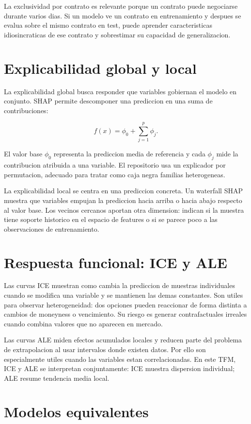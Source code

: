 La exclusividad por contrato es relevante porque un contrato puede negociarse durante varios dias. Si un modelo ve un contrato en entrenamiento y despues se evalua sobre el mismo contrato en test, puede aprender caracteristicas idiosincraticas de ese contrato y sobrestimar su capacidad de generalizacion.

\section{Explicabilidad global y local}

La explicabilidad global busca responder que variables gobiernan el modelo en conjunto. SHAP permite descomponer una prediccion en una suma de contribuciones:

\[
f(x)=\phi_0+\sum_{j=1}^{p}\phi_j.
\]

El valor base $\phi_0$ representa la prediccion media de referencia y cada $\phi_j$ mide la contribucion atribuida a una variable. El repositorio usa un explicador por permutacion, adecuado para tratar como caja negra familias heterogeneas.

La explicabilidad local se centra en una prediccion concreta. Un waterfall SHAP muestra que variables empujan la prediccion hacia arriba o hacia abajo respecto al valor base. Los vecinos cercanos aportan otra dimension: indican si la muestra tiene soporte historico en el espacio de features o si se parece poco a las observaciones de entrenamiento.

\section{Respuesta funcional: ICE y ALE}

Las curvas ICE muestran como cambia la prediccion de muestras individuales cuando se modifica una variable y se mantienen las demas constantes. Son utiles para observar heterogeneidad: dos opciones pueden reaccionar de forma distinta a cambios de moneyness o vencimiento. Su riesgo es generar contrafactuales irreales cuando combina valores que no aparecen en mercado.

Las curvas ALE miden efectos acumulados locales y reducen parte del problema de extrapolacion al usar intervalos donde existen datos. Por ello son especialmente utiles cuando las variables estan correlacionadas. En este TFM, ICE y ALE se interpretan conjuntamente: ICE muestra dispersion individual; ALE resume tendencia media local.

\section{Modelos equivalentes}


